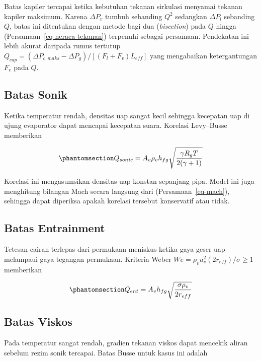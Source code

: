 \documentclass[
  indonesian,
  12pt,
  a4paper,
]{report}
\begin{document}
Batas kapiler tercapai ketika kebutuhan tekanan sirkulasi menyamai
tekanan kapiler maksimum. Karena \(\Delta P_v\) tumbuh sebanding
\(Q^{2}\) sedangkan \(\Delta P_l\) sebanding \(Q\), batas ini ditentukan
dengan metode bagi dua (\emph{bisection}) pada \(Q\) hingga
(Persamaan~\ref{eq-neraca-tekanan}) terpenuhi sebagai persamaan.
Pendekatan ini lebih akurat daripada rumus tertutup
\(Q_{cap} = (\Delta P_{c,maks} - \Delta P_g)/[(F_l + F_v)L_{eff}]\) yang
mengabaikan ketergantungan \(F_v\) pada \(Q\).

\subsection{Batas Sonik}\label{batas-sonik}

Ketika temperatur rendah, densitas uap sangat kecil sehingga kecepatan
uap di ujung evaporator dapat mencapai kecepatan suara. Korelasi
Levy--Busse memberikan

\begin{equation}\protect\phantomsection\label{eq-sonic}{Q_{sonic} = A_v \rho_v h_{fg} \sqrt{\frac{\gamma R_g T}{2(\gamma + 1)}}}\end{equation}

Korelasi ini mengasumsikan densitas uap konstan sepanjang pipa. Model
ini juga menghitung bilangan Mach secara langsung dari
(Persamaan~\ref{eq-mach}), sehingga dapat diperiksa apakah korelasi
tersebut konservatif atau tidak.

\subsection{Batas Entrainment}\label{batas-entrainment}

Tetesan cairan terlepas dari permukaan meniskus ketika gaya geser uap
melampaui gaya tegangan permukaan. Kriteria Weber
\(We = \rho_v u_v^{2}(2 r_{eff})/\sigma \ge 1\) memberikan

\begin{equation}\protect\phantomsection\label{eq-ent}{Q_{ent} = A_v h_{fg} \sqrt{\frac{\sigma \rho_v}{2 r_{eff}}}}\end{equation}

\subsection{Batas Viskos}\label{batas-viskos}

Pada temperatur sangat rendah, gradien tekanan viskos dapat mencekik
aliran sebelum rezim sonik tercapai. Batas Busse untuk kasus ini adalah
\end{document}
